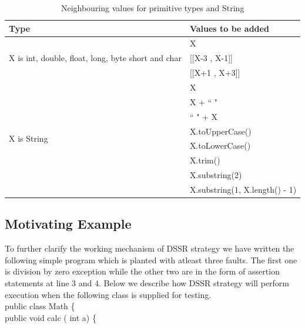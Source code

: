 \begin{table}[ht]
\scriptsize
\caption{Neighbouring values for primitive types and String} %
\centering %
\begin{tabular}{| l | l |} %
\hline\hline %
Type & Values to be added\\ [0.5ex] %
\hline %
\multirow{3}{*}{X is int, double, float, long, byte short and char} & X \\ %

&[[X-3 , X-1]] \\
&[[X+1 , X+3]]\\
\hline
\multirow{8}{*}{X is String} & X\\ %

& X + ``  "\\ %
& ``  " + X \\ %
& X.toUpperCase() \\
& X.toLowerCase() \\
& X.trim() \\
& X.substring(2) \\
& X.substring(1, X.length() - 1) \\[1ex]
\hline
\hline %
\end{tabular}
\label{table:addvalues} %
\end{table}


\subsection{Motivating Example}
To further clarify the working mechanism of DSSR strategy we have written the following simple program which is planted with atleast three faults. The first one is division by zero exception while the other two are in the form of assertion statements at line 3 and 4.  Below we describe how DSSR strategy will perform execution when the following class is supplied for testing.\\



public class Math \{\\

\hspace{7mm} public void calc ( int a) \{\\

